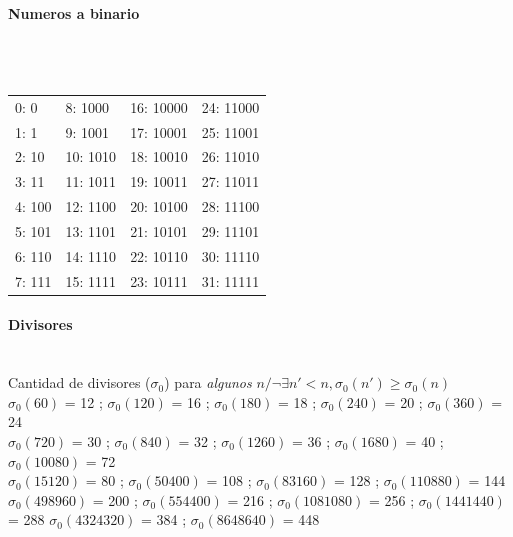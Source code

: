 \paragraph{Numeros a binario} \ \\\
\begin{tabular}{l|l|l|l}
  0: 0 & 8: 1000 & 16: 10000 & 24: 11000\\
  1: 1 & 9: 1001 & 17: 10001 & 25: 11001\\
  2: 10 & 10: 1010 & 18: 10010 & 26: 11010\\
  3: 11 & 11: 1011 & 19: 10011 & 27: 11011\\
  4: 100 & 12: 1100 & 20: 10100 & 28: 11100\\
  5: 101 & 13: 1101 & 21: 10101 & 29: 11101\\
  6: 110 & 14: 1110 & 22: 10110 & 30: 11110\\
  7: 111 & 15: 1111 & 23: 10111 & 31: 11111\\
\end{tabular}

\paragraph{Divisores} \ \\
Cantidad de divisores ($\sigma_0$) para \emph{algunos} $n / \neg\exists n'<n, \sigma_0(n') \geqslant \sigma_0(n)$ \\
$\sigma_0(60)$ = 12 ; $\sigma_0(120)$ = 16 ; $\sigma_0(180)$ = 18 ; $\sigma_0(240)$ = 20 ; $\sigma_0(360)$ = 24 \\
$\sigma_0(720)$ = 30 ; $\sigma_0(840)$ = 32 ; $\sigma_0(1260)$ = 36 ; $\sigma_0(1680)$ = 40 ; $\sigma_0(10080)$ = 72 \\ $\sigma_0(15120)$ = 80 ; $\sigma_0(50400)$ = 108 ; $\sigma_0(83160)$ = 128 ; $\sigma_0(110880)$ = 144 \\
$\sigma_0(498960)$ = 200 ; $\sigma_0(554400)$ = 216 ; $\sigma_0(1081080)$ = 256 ; $\sigma_0(1441440)$ = 288  $\sigma_0(4324320)$ = 384 ; $\sigma_0(8648640)$ = 448

